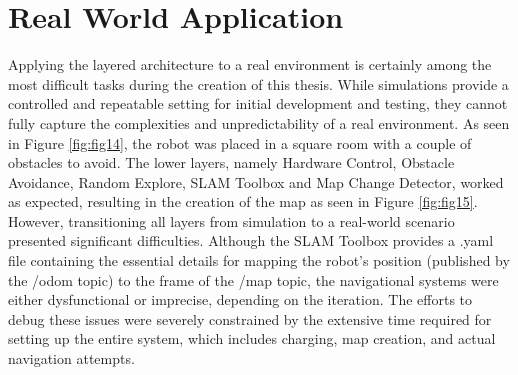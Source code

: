 \documentclass[%
paper=A4,               %
twoside=true,           %
openright,              %
11pt,                   %
bibliography=totoc,     %
titlepage=on,           %
DIV=12,                 %
BCOR=1.5cm,             %
parskip=half,            %
final
]{scrreprt}
\begin{document}
	\section{Real World Application} 
	Applying the layered architecture to a real environment is certainly among the most difficult tasks during the creation of this thesis. While simulations provide a controlled and repeatable setting for initial development and testing, they cannot fully capture the complexities and unpredictability of a real environment. 
	As seen in Figure \ref{fig:fig14}, the robot was placed in a square room with a couple of obstacles to avoid. The lower layers, namely Hardware Control, Obstacle Avoidance, Random Explore, SLAM Toolbox and Map Change Detector, worked as expected, resulting in the creation of the map as seen in Figure \ref{fig:fig15}. However, transitioning all layers from simulation to a real-world scenario presented significant difficulties. Although the SLAM Toolbox provides a .yaml file containing the essential details for mapping the robot's position (published by the /odom topic) to the frame of the /map topic, the navigational systems were either dysfunctional or imprecise, depending on the iteration. The efforts to debug these issues were severely constrained by the extensive time required for setting up the entire system, which includes charging, map creation, and actual navigation attempts.
	
\end{document}
